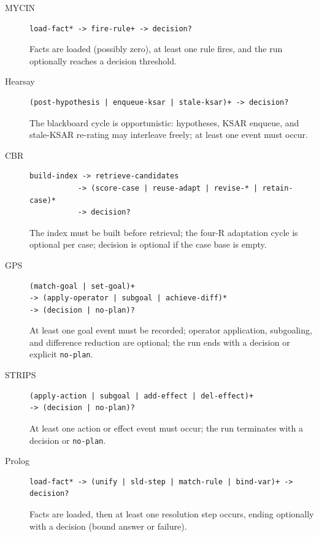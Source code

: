 \begin{description}

\item[MYCIN]
\begin{verbatim}
load-fact* -> fire-rule+ -> decision?
\end{verbatim}
Facts are loaded (possibly zero), at least one rule fires, and the run optionally
reaches a decision threshold.

\item[Hearsay]
\begin{verbatim}
(post-hypothesis | enqueue-ksar | stale-ksar)+ -> decision?
\end{verbatim}
The blackboard cycle is opportunistic: hypotheses, KSAR enqueue, and stale-KSAR
re-rating may interleave freely; at least one event must occur.

\item[CBR]
\begin{verbatim}
build-index -> retrieve-candidates
           -> (score-case | reuse-adapt | revise-* | retain-case)*
           -> decision?
\end{verbatim}
The index must be built before retrieval; the four-R adaptation cycle is optional
per case; decision is optional if the case base is empty.

\item[GPS]
\begin{verbatim}
(match-goal | set-goal)+
-> (apply-operator | subgoal | achieve-diff)*
-> (decision | no-plan)?
\end{verbatim}
At least one goal event must be recorded; operator application, subgoaling,
and difference reduction are optional; the run ends with a decision or
explicit \texttt{no-plan}.

\item[STRIPS]
\begin{verbatim}
(apply-action | subgoal | add-effect | del-effect)+
-> (decision | no-plan)?
\end{verbatim}
At least one action or effect event must occur; the run terminates with a
decision or \texttt{no-plan}.

\item[Prolog]
\begin{verbatim}
load-fact* -> (unify | sld-step | match-rule | bind-var)+ -> decision?
\end{verbatim}
Facts are loaded, then at least one resolution step occurs, ending
optionally with a decision (bound answer or failure).


\end{description}
